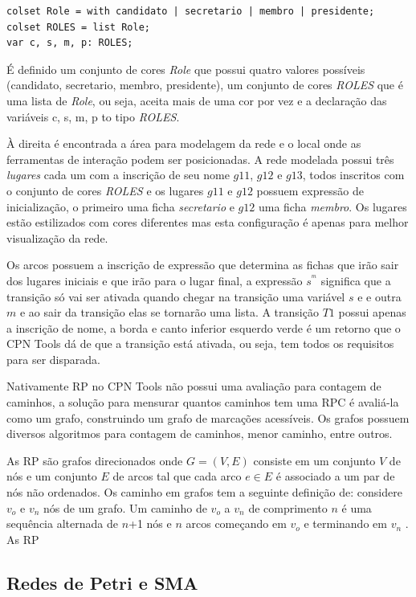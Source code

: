 \begin{lstlisting}
colset Role = with candidato | secretario | membro | presidente;
colset ROLES = list Role;
var c, s, m, p: ROLES;
\end{lstlisting}

É definido um conjunto de cores \textit{Role} que possui quatro valores possíveis (candidato, secretario, membro, presidente), um conjunto de cores \textit{ROLES} que é uma lista de \textit{Role}, ou seja, aceita mais de uma cor por vez e a declaração das variáveis c, s, m, p to tipo \textit{ROLES}.

À direita é encontrada a área para modelagem da rede e o local onde as ferramentas de interação podem ser posicionadas. A rede modelada possui três \textit{lugares} cada um com a inscrição de seu nome $g11$, $g12$ e $g13$, todos  inscritos com o conjunto de cores \textit{ROLES} e os lugares $g11$ e $g12$ possuem expressão de inicialização, o primeiro uma ficha \textit{secretario} e $g12$ uma ficha \textit{membro}. Os lugares estão estilizados com cores diferentes mas esta configuração é apenas para melhor visualização da rede.

Os arcos possuem a inscrição de expressão que determina as fichas que irão sair dos lugares iniciais e que irão para o lugar final, a expressão $s^^m$ significa que a transição só vai ser ativada quando chegar na transição uma variável $s$ e e outra $m$ e ao sair da transição elas se tornarão uma lista. A transição $T1$ possui apenas a inscrição de nome, a borda e canto inferior esquerdo verde é um retorno que o CPN Tools dá de que a transição está ativada, ou seja, tem todos os requisitos para ser disparada.

Nativamente RP no CPN Tools não possui uma avaliação para contagem de caminhos, a solução para mensurar quantos caminhos tem uma RPC é avaliá-la como um grafo, construindo um grafo de marcações acessíveis. Os grafos possuem diversos algoritmos para contagem de caminhos, menor caminho, entre outros. 

As RP são grafos direcionados onde $G = (V, E)$ consiste em um conjunto $V$ de nós e um conjunto $E$ de arcos tal que cada arco $e \in E$ é associado a um par de nós não ordenados. Os caminho em grafos tem a seguinte definição de: considere $v_{o}$ e $v_{n}$ nós de um grafo. Um caminho de $v_{o}$ a $v_{n}$ de comprimento $n$ é uma sequência alternada de $n$+1 nós e $n$ arcos começando em $v_{o}$ e terminando em $v_{n}$ \cite{cardoso1997redes}. As RP
  

\subsection{Redes de Petri e SMA}

